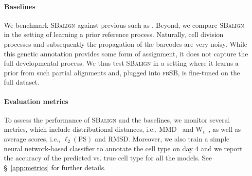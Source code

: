 \begin{table}
    \caption{\textbf{Cell differentiation prediction results.} Shown are distributional metrics (MMD, $\text{W}_{\epsilon}$), alignment-based metrics ($\ell_2$, RMSD), and cell type classification accuracy for different methods on the cell differentiation dataset. \vspace{-5pt}}
    \label{tab:results_cells}
     \centering
\end{table}

\paragraph{Baselines}  We benchmark \textsc{SBalign} against previous  such as \citep[\textsc{fbSB}]{chen2021likelihood}. Beyond, we compare \textsc{SBalign} in the setting of learning a prior reference process. Naturally, cell division processes and subsequently the propagation of the barcodes are very noisy. While this genetic annotation provides some form of assignment, it does not capture the full developmental process. We thus test \textsc{SBalign} in a setting where it learns a prior from such partial alignments and, plugged into \textsc{fbSB}, is fine-tuned on the full dataset.
 
\paragraph{Evaluation metrics} To assess the performance of \textsc{SBalign} and the baselines, we monitor several metrics, which include distributional distances, i.e., MMD~\citep{gretton2012kernel} and $\text{W}_{\epsilon}$~\citep{cuturi2013sinkhorn}, as well as average scores, i.e., $\ell_2(\text{PS})$ \citep{bunne2021learning} and RMSD. Moreover, we also train a simple neural network-based classifier to annotate the cell type on day 4 and we report the accuracy of the predicted vs. true cell type for all the models. See \S~\ref{app:metrics} for further details.

